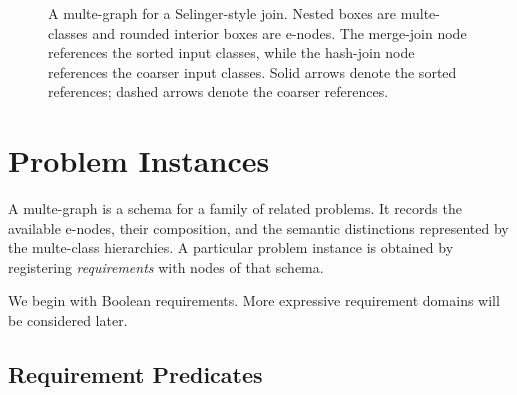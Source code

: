 \documentclass[sigconf,nonacm]{acmart}
\theoremstyle{definition}
\theoremstyle{plain}
\theoremstyle{remark}
\begin{document}
\begin{figure}[t]
{%
}

\caption{
A multe-graph for a Selinger-style join.
Nested boxes are multe-classes and rounded interior boxes are
e-nodes.
The merge-join node references the sorted input classes, while
the hash-join node references the coarser input classes.
Solid arrows denote the sorted references; dashed arrows denote
the coarser references.
}
\label{fig:selinger-multe-graph}
\end{figure}

\section{Problem Instances}
\label{sec:instances}

A multe-graph is a schema for a family of related problems.
It records the available e-nodes, their composition, and the semantic
distinctions represented by the multe-class hierarchies.
A particular problem instance is obtained by registering
\emph{requirements} with nodes of that schema.

We begin with Boolean requirements.
More expressive requirement domains will be considered later.

\subsection{Requirement Predicates}
\label{sec:requirement-predicates}
\end{document}
